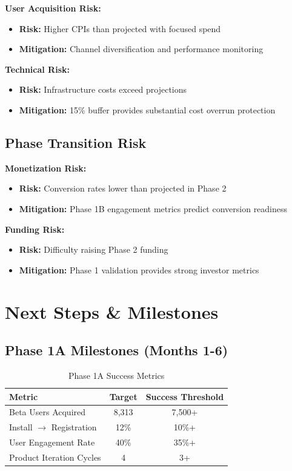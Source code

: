 \documentclass[11pt,letterpaper]{article}
\begin{document}
\textbf{User Acquisition Risk:}
\begin{itemize}
\item \textbf{Risk:} Higher CPIs than projected with focused spend
\item \textbf{Mitigation:} Channel diversification and performance monitoring
\end{itemize}

\textbf{Technical Risk:}
\begin{itemize}
\item \textbf{Risk:} Infrastructure costs exceed projections
\item \textbf{Mitigation:} 15\% buffer provides substantial cost overrun protection
\end{itemize}

\subsection{Phase Transition Risk}

\textbf{Monetization Risk:}
\begin{itemize}
\item \textbf{Risk:} Conversion rates lower than projected in Phase 2
\item \textbf{Mitigation:} Phase 1B engagement metrics predict conversion readiness
\end{itemize}

\textbf{Funding Risk:}
\begin{itemize}
\item \textbf{Risk:} Difficulty raising Phase 2 funding
\item \textbf{Mitigation:} Phase 1 validation provides strong investor metrics
\end{itemize}

\newpage

\section{Next Steps \& Milestones}

\subsection{Phase 1A Milestones (Months 1-6)}

\begin{table}[h]
\centering
\caption{Phase 1A Success Metrics}
\begin{tabular}{|l|c|c|}
\hline
\textbf{Metric} & \textbf{Target} & \textbf{Success Threshold} \\
\hline
Beta Users Acquired & 8,313 & 7,500+ \\
Install $\rightarrow$ Registration & 12\% & 10\%+ \\
User Engagement Rate & 40\% & 35\%+ \\
Product Iteration Cycles & 4 & 3+ \\
\hline
\end{tabular}
\end{table}
\end{document}
